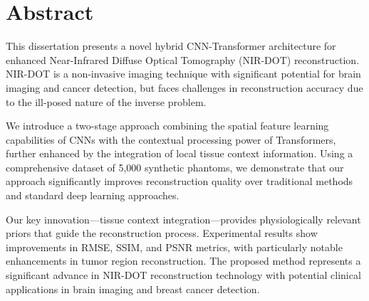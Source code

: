 
\chapter*{Abstract}

This dissertation presents a novel hybrid CNN-Transformer architecture for enhanced Near-Infrared Diffuse Optical Tomography (NIR-DOT) reconstruction. NIR-DOT is a non-invasive imaging technique with significant potential for brain imaging and cancer detection, but faces challenges in reconstruction accuracy due to the ill-posed nature of the inverse problem. 

We introduce a two-stage approach combining the spatial feature learning capabilities of CNNs with the contextual processing power of Transformers, further enhanced by the integration of local tissue context information. Using a comprehensive dataset of 5,000 synthetic phantoms, we demonstrate that our approach significantly improves reconstruction quality over traditional methods and standard deep learning approaches. 

Our key innovation—tissue context integration—provides physiologically relevant priors that guide the reconstruction process. Experimental results show improvements in RMSE, SSIM, and PSNR metrics, with particularly notable enhancements in tumor region reconstruction. The proposed method represents a significant advance in NIR-DOT reconstruction technology with potential clinical applications in brain imaging and breast cancer detection.